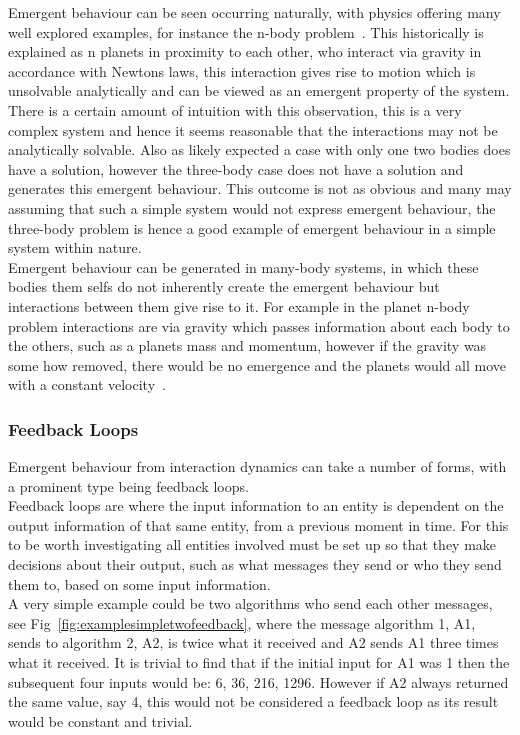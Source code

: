 \documentclass{article}
\begin{document}
Emergent behaviour can be seen occurring naturally, with physics offering many well explored examples, for instance the n-body problem~\cite{nbodyproblem}. This historically is explained as n planets in proximity to each other, who interact via gravity in accordance with Newtons laws, this interaction gives rise to motion which is unsolvable analytically and can be viewed as an emergent property of the system. There is a certain amount of intuition with this observation, this is a very complex system and hence it seems reasonable that the interactions may not be analytically solvable. Also as likely expected a case with only one two bodies does have a solution, however the three-body case does not have a solution and generates this emergent behaviour. This outcome is not as obvious and many may assuming that such a simple system would not express emergent behaviour, the three-body problem is hence a good example of emergent behaviour in a simple system within nature.\\     
Emergent behaviour can be generated in many-body systems, in which these bodies them selfs do not inherently create the emergent behaviour but interactions between them give rise to it. For example in the planet n-body problem interactions are via gravity which passes information about each body to the others, such as a planets mass and momentum, however if the gravity was some how removed, there would be no emergence and the planets would all move with a constant velocity~\cite{newtonconstantvelocity}.

\subsubsection{Feedback Loops}

Emergent behaviour from interaction dynamics can take a number of forms, with a prominent type being feedback loops.\\
Feedback loops are where the input information to an entity is dependent on the output information of that same entity, from a previous moment in time. For this to be worth investigating all entities involved must be set up so that they make decisions about their output, such as what messages they send or who they send them to, based on some input information.\\
A very simple example could be two algorithms who send each other messages, see Fig~\ref{fig:examplesimpletwofeedback}, where the message algorithm 1, A1, sends to algorithm 2, A2, is twice what it received and A2 sends A1 three times what it received. It is trivial to find that if the initial input for A1 was 1 then the subsequent four inputs would be: 6, 36, 216, 1296. However if A2 always returned the same value, say 4, this would not be considered a feedback loop as its result would be constant and trivial.         
\end{document}
